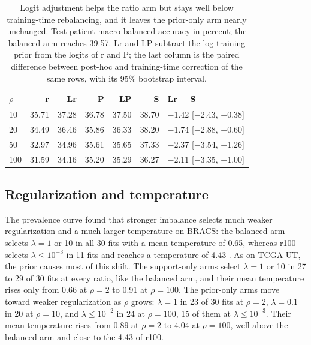 \begin{table}[htbp]
\centering
\renewcommand{\arraystretch}{1.15}
\begin{tabular}{@{}lrrrrrl@{}}
\toprule
$\rho$ & r & Lr & P & LP & S & Lr $-$ S \\
\midrule
10 & 35.71 & 37.28 & 36.78 & 37.50 & 38.70 & $-$1.42 [$-$2.43, $-$0.38] \\
20 & 34.49 & 36.46 & 35.86 & 36.33 & 38.20 & $-$1.74 [$-$2.88, $-$0.60] \\
50 & 32.97 & 34.96 & 35.61 & 35.65 & 37.33 & $-$2.37 [$-$3.54, $-$1.26] \\
100 & 31.59 & 34.16 & 35.20 & 35.29 & 36.27 & $-$2.11 [$-$3.35, $-$1.00] \\
\bottomrule
\end{tabular}
\caption{Logit adjustment helps the ratio arm but stays well below training-time rebalancing, and it leaves the prior-only arm nearly unchanged. Test patient-macro balanced accuracy in percent; the balanced arm reaches 39.57. Lr and LP subtract the log training prior from the logits of r and P; the last column is the paired difference between post-hoc and training-time correction of the same rows, with its 95\% bootstrap interval.}
\label{tab:adjustment}
\end{table}

\subsection{Regularization and temperature}
\label{sec:selection-results}
The prevalence curve found that stronger imbalance selects much weaker regularization and a much larger temperature on BRACS: the balanced arm selects $\lambda=1$ or 10 in all 30 fits with a mean temperature of 0.65, whereas r100 selects $\lambda\leq10^{-3}$ in 11 fits and reaches a temperature of 4.43 \citep{queisler2026prevalenceBracs}. As on TCGA-UT, the prior causes most of this shift. The support-only arms select $\lambda=1$ or 10 in 27 to 29 of 30 fits at every ratio, like the balanced arm, and their mean temperature rises only from 0.66 at $\rho=2$ to 0.91 at $\rho=100$. The prior-only arms move toward weaker regularization as $\rho$ grows: $\lambda=1$ in 23 of 30 fits at $\rho=2$, $\lambda=0.1$ in 20 at $\rho=10$, and $\lambda\leq10^{-2}$ in 24 at $\rho=100$, 15 of them at $\lambda\leq10^{-3}$. Their mean temperature rises from 0.89 at $\rho=2$ to 4.04 at $\rho=100$, well above the balanced arm and close to the 4.43 of r100.

